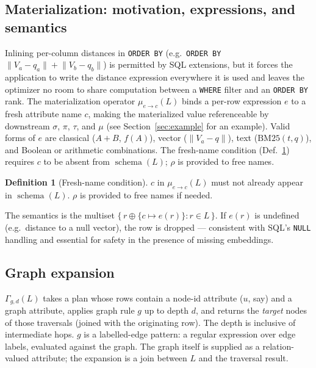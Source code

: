 \documentclass[acmsmall,review,anonymous]{acmart}
\theoremstyle{plain}
\theoremstyle{definition}
\newtheorem{definition}{Definition}
\newcommand{\schema}[1]{\operatorname{schema}(#1)}
\theoremstyle{remark}
\begin{document}
\subsection{Materialization: motivation, expressions, and semantics}

Inlining per-column distances in \texttt{ORDER BY} (e.g.\
\texttt{ORDER BY} $\lVert V_a - q_a \rVert + \lVert V_b - q_b
\rVert$) is permitted by SQL extensions, but it forces the
application to write the distance expression everywhere it is used
and leaves the optimizer no room to share computation between a
\texttt{WHERE} filter and an \texttt{ORDER BY} rank. The
materialization operator $\mu_{e \to c}(L)$ binds a per-row
expression $e$ to a fresh attribute name $c$, making the
materialized value referenceable by downstream $\sigma$, $\pi$,
$\tau$, and $\mu$ (see
Section~\ref{sec:example} for an example). Valid forms of $e$ are
classical ($A + B$, $f(A)$), vector ($\lVert V_a - q \rVert$),
text ($\mathrm{BM25}(t, q)$), and Boolean or arithmetic combinations.
The fresh-name condition (Def.~\ref{def:fresh}) requires $c$ to be
absent from $\schema{L}$; $\rho$ is provided to free names.

\begin{definition}[Fresh-name condition]\label{def:fresh}
$c$ in $\mu_{e\to c}(L)$ must not already appear in $\schema{L}$.
$\rho$ is provided to free names if needed.
\end{definition}

The semantics is the multiset $\{\, r \oplus \{c \mapsto e(r)\} :
r \in L \,\}$. If $e(r)$ is undefined (e.g.\ distance to a null
vector), the row is dropped --- consistent with SQL's \texttt{NULL}
handling and essential for safety in the presence of missing
embeddings.

\subsection{Graph expansion}

$\Gamma_{g,d}(L)$ takes a plan whose rows contain a node-id attribute
($u$, say) and a graph attribute, applies graph rule $g$ up to depth
$d$, and returns the \emph{target} nodes of those traversals (joined
with the originating row). The depth is inclusive of intermediate
hops. $g$ is a labelled-edge pattern: a regular expression over edge
labels, evaluated against the graph. The graph itself is supplied as
a relation-valued attribute; the expansion is a join between $L$ and
the traversal result.
\end{document}
